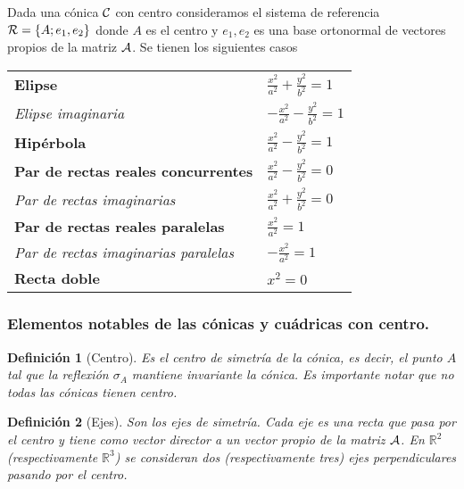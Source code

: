 \documentclass[11pt, a4paper]{article}
\newif\IfInSansMode
\theoremstyle{theorem-style}
\theoremstyle{definition-style}
\newtheorem{ndef}{Definición}[section]
\theoremstyle{remark-style}
\theoremstyle{example-style}
\begin{document}
\vspace{.5cm}

Dada una c\'onica $\cal C$ con centro consideramos el sistema de referencia 
${\cal R}=\{A; e_1,e_2\}$ donde $A$ 
es el centro y $e_1,e_2$ es una base ortonormal de vectores propios de la matriz $\cal A$. Se tienen los siguientes casos

\vspace{.8cm}

\begin{tabular}{ll}
{\bf Elipse} \hspace{5cm} & 
$
\frac{{x}^2}{a^2} + \frac{{y}^2}{b^2} = 1
$
\vspace{.4cm}
\\
{\it Elipse imaginaria}  &
$
-\frac{{x}^2}{a^2} - \frac{{y}^2}{b^2} = 1
$
\vspace{.4cm}
\\
{\bf  Hip\'erbola}  &
$
\frac{{x}^2}{a^2} - \frac{{y}^2}{b^2} = 1
$
\vspace{.4cm}
\\
{\bf  Par de rectas reales concurrentes}  &
$
\frac{{x}^2}{a^2} - \frac{{y}^2}{b^2}=0
$
\vspace{.4cm}
\\
{\it Par de rectas imaginarias} &
$
\frac{{x}^2}{a^2} + \frac{{y}^2}{b^2}=0
$
\vspace{.4cm}
\\
{\bf  Par de rectas reales paralelas}  &
$
\frac{{x}^2}{a^2}=1
$
\vspace{.4cm}
\\
{\it Par de rectas imaginarias paralelas}  &
$
-\frac{{x}^2}{a^2} = 1
$
\vspace{.4cm}
\\
{\bf  Recta doble}  &
$
{{x}^2} = 0
$
\vspace{.3cm}
\\
\end{tabular}
\subsubsection{\bf  Elementos notables de las c\'onicas y cu\'adricas con centro.}

\begin{ndef}[Centro]
	Es el centro de simetría de la cónica, es decir, el punto $A$ tal que la reflexión $\sigma_A$ mantiene invariante la cónica. Es importante notar que no todas las cónicas tienen centro.
\end{ndef}


\begin{ndef}[Ejes]
	 Son los ejes de simetr\'ia. Cada eje es una recta que pasa por el centro y tiene como vector director a un vector propio de la matriz $\cal A$. En $\mathbb{R}^2$ (respectivamente $\mathbb{R}^3$) se consideran dos (respectivamente tres)  ejes perpendiculares pasando por el centro.
\end{ndef}
\end{document}
